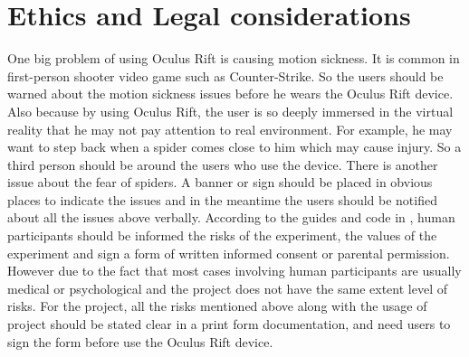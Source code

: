 \section{Ethics and Legal considerations}
One big problem of using Oculus Rift is causing motion sickness\cite{motionSick}. It is common in first-person shooter video game such as Counter-Strike. So the users should be warned about the motion sickness issues before he wears the Oculus Rift device. Also because by using Oculus Rift, the user is so deeply immersed in the virtual reality that he may not pay attention to real environment. For example, he may want to step back when a spider comes close to him which may cause injury. So a third person should be around the users who use the device. 
There is another issue about the fear of spiders. A banner or sign should be placed in obvious places to indicate the issues and in the meantime the users should be notified about all the issues above verbally.
According to the guides and code in \cite{ushuman}\cite{ukhuman}\cite{humanPro}, human participants should be informed the risks of the experiment, the values of the experiment and sign a form of written informed consent or parental permission. However due to the fact that most cases involving human participants are usually medical or psychological and the project does not have the same extent level of risks. For the project, all the risks mentioned above along with the usage of project should be stated clear in a print form documentation, and need users to sign the form before use the Oculus Rift device.
